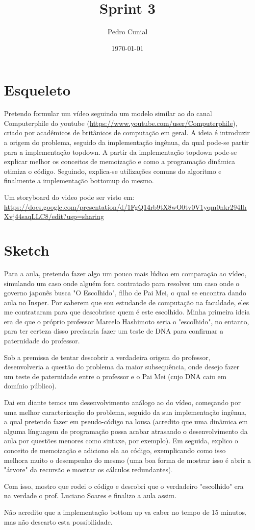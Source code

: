 \documentclass[11pt]{article}
\author{Pedro Cunial}
\date{\today}
\title{Sprint 3}
\begin{document}
\maketitle
\tableofcontents


\section{Esqueleto}
\label{sec:org0dc56ee}
Pretendo formular um vídeo seguindo um modelo similar ao do canal Computerphile
do youtube (\url{https://www.youtube.com/user/Computerphile}), criado por acadêmicos
de britânicos de computação em geral. A ideia é introduzir a origem do problema,
seguido da implementação ingênua, da qual pode-se partir para a implementação
topdown. A partir da implementação topdown pode-se explicar melhor os conceitos de
memoização e como a programação dinâmica otimiza o código. Seguindo, explica-se
utilizações comuns do algoritmo e finalmente a implementação bottomup do mesmo.

Um storyboard do video pode ser visto em: \url{https://docs.google.com/presentation/d/1FgQ14rb9tX8wO0tv0V1yqm0nkr294IhXvj44saqLLC8/edit?usp=sharing}

\section{Sketch}
\label{sec:org1484be5}
Para a aula, pretendo fazer algo um pouco mais lúdico em comparação ao vídeo,
simulando um caso onde alguém fora contratado para resolver um caso onde o governo
japonês busca "O Escolhido", filho de Pai Mei, o qual se encontra dando aula no
Insper. Por saberem que sou estudande de computação na faculdade, eles me contrataram
para que descobrisse quem é este escolhido. Minha primeira ideia era de que o próprio
professor Marcelo Hashimoto seria o "escolhido", no entanto, para ter certeza disso
precisaria fazer um teste de DNA para confirmar a paternidade do professor.

Sob a premissa de tentar descobrir a verdadeira origem do professor, desenvolveria a
questão do problema da maior subsequência, onde desejo fazer um teste de paternidade
entre o professor e o Pai Mei (cujo DNA caiu em domínio público).

Dai em diante temos um desenvolvimento análogo ao do vídeo, começando por uma melhor
caracterização do problema, seguido da sua implementação ingênua, a qual pretendo fazer
em pseudo-código na lousa (acredito que uma dinâmica em alguma línguagem de programação
possa acabar atrasando o desenvolvimento da aula por questões menores como sintaxe, por
exemplo). Em seguida, explico o conceito de memoização e adiciono ela ao código,
exemplicando como isso melhora muito o desempenho do mesmo (uma boa forma de mostrar isso
é abrir a "árvore" da recursão e mostrar os cálculos redundantes).

Com isso, mostro que rodei o código e descobri que o verdadeiro "escolhido" era na
verdade o prof. Luciano Soares e finalizo a aula assim.

Não acredito que a implementação bottom up va caber no tempo de 15 minutos, mas não
descarto esta possibilidade.
\end{document}
